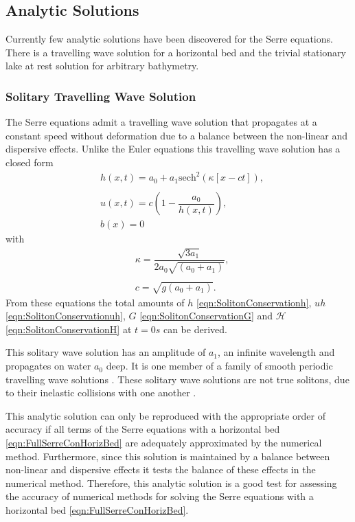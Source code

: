 \subsection{Analytic Solutions}
Currently few analytic solutions have been discovered for the Serre equations. There is a travelling wave solution for a horizontal bed \cite{El-etal-2006} and the trivial stationary lake at rest solution for arbitrary bathymetry.


\subsubsection{Solitary Travelling Wave Solution}
The Serre equations admit a travelling wave solution that propagates at a constant speed without deformation due to a balance between the non-linear and dispersive effects. Unlike the Euler equations this travelling wave solution has a closed form
\begin{subequations}
	\begin{align}
	&h(x,t) = a_0 + a_1\text{sech}^2\left(\kappa \left[x - ct\right]\right), \\  \nonumber \\
	&u(x,t) = c\left(1 - \dfrac{a_0}{h(x,t)}\right), \\
	&b(x) = 0
	\end{align}
	\label{eqn:Solitondefhub}
\end{subequations}
with
\begin{align*}
&\kappa = \dfrac{\sqrt{3a_1}}{2 a_0\sqrt{\left(a_0 + a_1\right)}}, \\ \\
&c = \sqrt{g(a_0 + a_1)}.
\end{align*}
From these equations the total amounts of $h$ \eqref{eqn:SolitonConservationh}, $uh$ \eqref{eqn:SolitonConservationuh}, $G$ \eqref{eqn:SolitonConservationG} and $\mathcal{H}$ \eqref{eqn:SolitonConservationH} at $t=0s$ can be derived.

This solitary wave solution has an amplitude of $a_1$, an infinite wavelength and propagates on water $a_0$ deep. It is one member of a family of smooth periodic travelling wave solutions \cite{El-etal-2006}. These solitary wave solutions are not true solitons, due to their inelastic collisions with one another \cite{Dutykh-etal-2013-761}. 

This analytic solution can only be reproduced with the appropriate order of accuracy if all terms of the Serre equations with a horizontal bed \eqref{eqn:FullSerreConHorizBed} are adequately approximated by the numerical method. Furthermore, since this solution is maintained by a balance between non-linear and dispersive effects it tests the balance of these effects in the numerical method. Therefore, this analytic solution is a good test for assessing the accuracy of numerical methods for solving the Serre equations with a horizontal bed \eqref{eqn:FullSerreConHorizBed}.

